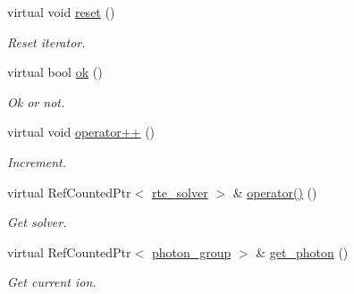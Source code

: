 \begin{DoxyCompactItemize}
virtual void \hyperlink{classrte__iterator_a7f5e8122b178062d7b25323c670a565f}{reset} ()
\begin{DoxyCompactList}\small\item\em Reset iterator. \end{DoxyCompactList}\item 
virtual bool \hyperlink{classrte__iterator_a8659ed5cc8a986e2931e077f5e089021}{ok} ()
\begin{DoxyCompactList}\small\item\em Ok or not. \end{DoxyCompactList}\item 
virtual void \hyperlink{classrte__iterator_a0df2e420dbf4627b8495fb14847b1c22}{operator++} ()
\begin{DoxyCompactList}\small\item\em Increment. \end{DoxyCompactList}\item 
virtual Ref\+Counted\+Ptr$<$ \hyperlink{classrte__solver}{rte\+\_\+solver} $>$ \& \hyperlink{classrte__iterator_ace0ac3578dd89f82f4daf049cc8c45de}{operator()} ()
\begin{DoxyCompactList}\small\item\em Get solver. \end{DoxyCompactList}\item 
virtual Ref\+Counted\+Ptr$<$ \hyperlink{classphoton__group}{photon\+\_\+group} $>$ \& \hyperlink{classrte__iterator_ae46187a6e5bce2167e4ac6d35ec4134f}{get\+\_\+photon} ()
\begin{DoxyCompactList}\small\item\em Get current ion. \end{DoxyCompactList}\end{DoxyCompactItemize}
